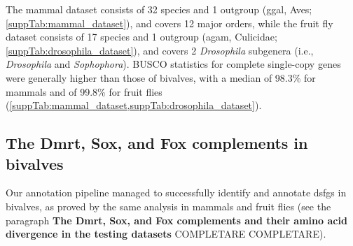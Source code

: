 The mammal dataset consists of 32 species and 1 outgroup (\gls{ggal}, Aves; \cref{suppTab:mammal_dataset}), and covers 12 major orders, while the fruit fly dataset consists of 17 species and 1 outgroup (\gls{agam}, Culicidae; \cref{suppTab:drosophila_dataset}), and covers 2 \textit{Drosophila} subgenera (i.e., \textit{Drosophila} and \textit{Sophophora}). BUSCO statistics for complete single-copy genes were generally higher than those of bivalves, with a median of 98.3\% for mammals and of 99.8\% for fruit flies (\cref{suppTab:mammal_dataset,suppTab:drosophila_dataset}).

\subsection{The Dmrt, Sox, and Fox complements in bivalves}
Our annotation pipeline managed to successfully identify and annotate \glspl{dsfg} in bivalves, as proved by the same analysis in mammals and fruit flies (see the paragraph \textbf{The Dmrt, Sox, and Fox complements and their amino acid divergence in the testing datasets} COMPLETARE COMPLETARE).

